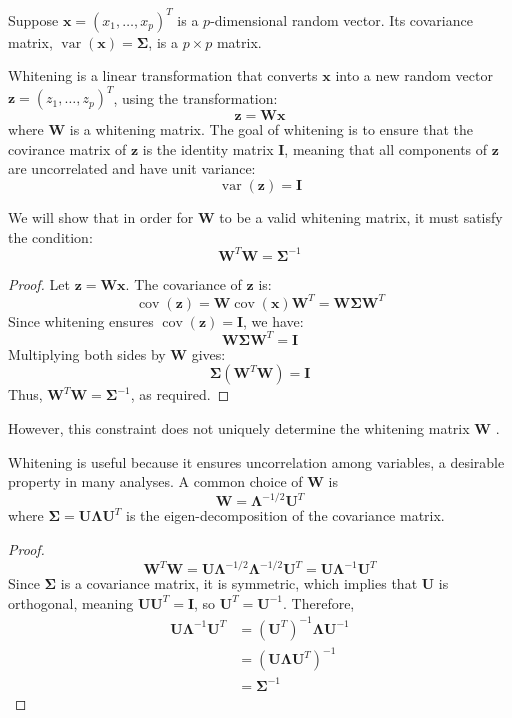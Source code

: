 \documentclass[12pt]{article}
\begin{document}
Suppose \( \mathbf{x}=\left(x_1, \ldots, x_p\right)^T \) is a \( p \)-dimensional random vector. Its covariance matrix, \( \operatorname{var} (\mathbf{x}) = \boldsymbol{\Sigma} \), is a  \( p \times p \) matrix.

Whitening is a linear transformation that converts \( \mathbf{x} \) into a new random vector \( \mathbf{z}=\left(z_1, \ldots, z_p\right)^T \), using the transformation:
\[
  \mathbf{z}=\mathbf{W} \mathbf{x}
\]
where \( \mathbf{W} \) is a whitening matrix. The goal of whitening is to ensure that the covirance matrix of \( \mathbf{z} \) is the identity matrix \( \mathbf{I} \), meaning that all components of \( \mathbf{z} \) are uncorrelated and have unit variance:
\[
  \operatorname{var}(\mathbf{z})=\mathbf{I}
\]

We will show that in order for \( \mathbf{W} \) to be a valid whitening matrix, it must satisfy the condition:
\[
  \mathbf{W}^T \mathbf{W}=\boldsymbol{\Sigma}^{-1}
\]

\begin{proof}
  Let \( \mathbf{z} = \mathbf{W} \mathbf{x} \). The covariance of \( \mathbf{z} \) is:
  \[
    \operatorname{cov}(\mathbf{z}) = \mathbf{W} \operatorname{cov}(\mathbf{x}) \mathbf{W}^T = \mathbf{W} \boldsymbol{\Sigma} \mathbf{W}^T
  \]
  Since whitening ensures \( \operatorname{cov}(\mathbf{z}) = \mathbf{I} \), we have:
  \[
    \mathbf{W} \boldsymbol{\Sigma} \mathbf{W}^T = \mathbf{I}
  \]
  Multiplying both sides by \( \mathbf{W} \) gives:
  \[
    \boldsymbol{\Sigma} (\mathbf{W}^T \mathbf{W}) = \mathbf{I}
  \]
  Thus, \( \mathbf{W}^T \mathbf{W} = \boldsymbol{\Sigma}^{-1} \), as required.
\end{proof}

However, this constraint does not uniquely determine the whitening matrix \( \mathbf{W} \) \cite{Kessy_Lewin_Strimmer_2018}.

Whitening is useful because it ensures uncorrelation among variables, a desirable property in many analyses. A common choice of \( \mathbf{W} \) is
\[
  \mathbf{W}=\boldsymbol{\Lambda}^{-1 / 2} \mathbf{U}^T
\]
where \( \boldsymbol{\Sigma}=\mathbf{U} \boldsymbol{\Lambda} \mathbf{U}^T \) is the eigen-decomposition of the covariance matrix. 

\begin{proof}
  \[
    \mathbf{W}^T \mathbf{W}=\mathbf{U} \boldsymbol{\Lambda}^{-1 / 2} \boldsymbol{\Lambda}^{-1 / 2} \mathbf{U}^T=\mathbf{U} \boldsymbol{\Lambda}^{-1} \mathbf{U}^T
  \]
  Since \( \boldsymbol{\Sigma} \) is a covariance matrix, it is symmetric, which implies that \( \mathbf{U} \) is orthogonal, meaning \( \mathbf{U U}^T = \mathbf{I} \), so \( \mathbf{U}^T = \mathbf{U}^{-1} \). Therefore,
  \[
    \begin{aligned}
      \mathbf{U} \boldsymbol{\Lambda}^{-1} \mathbf{U}^T & = \left(\mathbf{U}^T\right)^{-1} \boldsymbol{\Lambda} \mathbf{U}^{-1} \\
                                                        & = \left(\mathbf{U} \boldsymbol{\Lambda} \mathbf{U}^T\right)^{-1} \\
                                                        & = \boldsymbol{\Sigma}^{-1}
  \end{aligned}
  \]
\end{proof}
\end{document}
